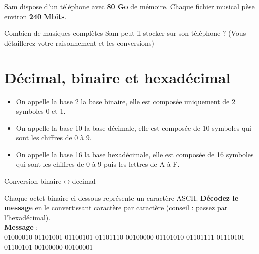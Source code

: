 \documentclass[a4paper, noanswers, addpoints, 12pt]{exam}
\begin{document}
 Sam dispose d'un téléphone avec \textbf{80 Go} de mémoire. Chaque fichier musical pèse environ \textbf{240 Mbits}.
\begin{questions}
\question[2]
Combien de musiques complètes Sam peut-il stocker sur son téléphone ? (Vous détaillerez votre raisonnement et les conversions)

\section{Décimal, binaire et hexadécimal}

\begin{tcolorbox}[enhanced,
    colback=yellow!25!black!10!white,colframe=yellow!75!black,title=Rappel,
    drop fuzzy shadow,watermark color=white]
    \begin{itemize}
        \item On appelle la base 2 la base binaire, elle est composée uniquement de 2 symboles 0 et 1.
        \item On appelle la base 10 la base décimale, elle est composée de 10 symboles qui sont les chiffres de 0 à 9.
        \item On appelle la base 16 la base hexadécimale, elle est composée de 16 symboles qui sont les chiffres de 0 à 9 puis les lettres de A à F.
    \end{itemize}
\end{tcolorbox}

\question[3] Conversion binaire$\leftrightarrow$decimal

\begin{tcolorbox}[enhanced,
    colback=yellow!25!black!10!white,colframe=yellow!75!black,title=Rappel,
    drop fuzzy shadow,watermark color=white]
    
\end{tcolorbox}
\question[2] Chaque octet binaire ci-dessous représente un caractère ASCII. \textbf{Décodez le message} en le convertissant caractère par caractère (conseil : passez par l'hexadécimal).\\ \textbf{Message} :\\
01000010 01101001 01100101 01101110 00100000 01101010 01101111 01110101 01100101 00100000 00100001


\end{questions}
\end{document}

